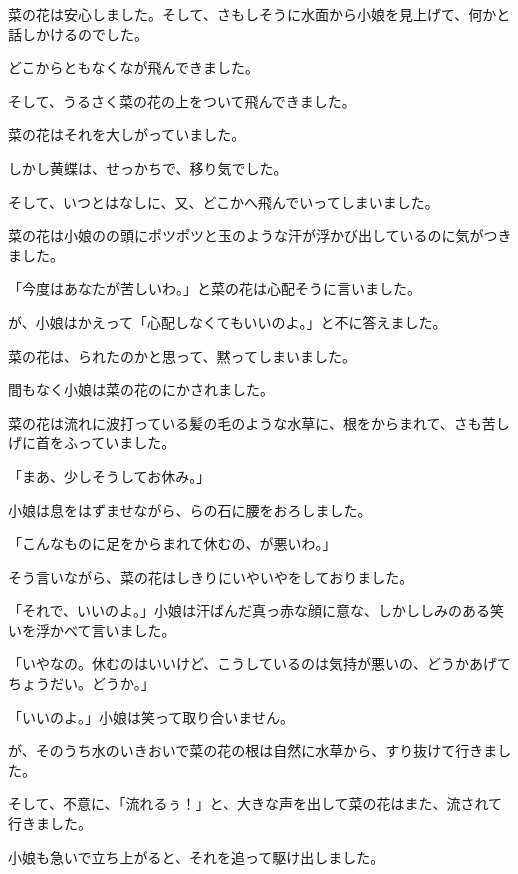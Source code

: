 菜の花は安心しました。そして、さもしそうに水面から小娘を見上げて、何かと話しかけるのでした。

どこからともなくなが飛んできました。

そして、うるさく菜の花の上をついて飛んできました。

菜の花はそれを大しがっていました。

しかし黄蝶は、せっかちで、移り気でした。

そして、いつとはなしに、又、どこかへ飛んでいってしまいました。

菜の花は小娘のの頭にポツポツと玉のような汗が浮かび出しているのに気がつきました。

「今度はあなたが苦しいわ。」と菜の花は心配そうに言いました。

が、小娘はかえって「心配しなくてもいいのよ。」と不に答えました。

菜の花は、られたのかと思って、黙ってしまいました。



間もなく小娘は菜の花のにかされました。

菜の花は流れに波打っている髪の毛のような水草に、根をからまれて、さも苦しげに首をふっていました。

「まあ、少しそうしてお休み。」

小娘は息をはずませながら、らの石に腰をおろしました。

「こんなものに足をからまれて休むの、が悪いわ。」

そう言いながら、菜の花はしきりにいやいやをしておりました。

「それで、いいのよ。」小娘は汗ばんだ真っ赤な顔に意な、しかししみのある笑いを浮かべて言いました。

「いやなの。休むのはいいけど、こうしているのは気持が悪いの、どうかあげてちょうだい。どうか。」

「いいのよ。」小娘は笑って取り合いません。

が、そのうち水のいきおいで菜の花の根は自然に水草から、すり抜けて行きました。

そして、不意に、「流れるぅ！」と、大きな声を出して菜の花はまた、流されて行きました。

小娘も急いで立ち上がると、それを追って駆け出しました。


